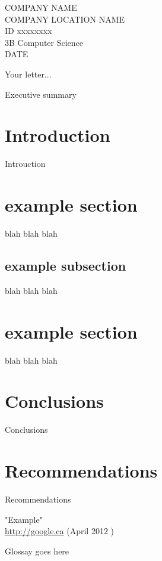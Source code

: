 \documentclass[12pt]{article}
\begin{document}
{
	COMPANY NAME\\
	COMPANY LOCATION
	}{
	NAME\\
	ID xxxxxxxx\\
	3B Computer Science \\
	DATE
}

\begin{UWletter}
Your letter...
\end{UWletter}



\UWtableofcontents



	Executive summary
\newpage




\ifoot[]{}
\cfoot[]{}
\ofoot[\pagemark]{\pagemark}
\pagestyle{scrplain}




\section{ Introduction }
	Introuction


\section{ example section }
	blah blah blah
	\subsection{ example subsection }
	blah blah blah
		

\section{ example section}
	blah blah blah

\section{ Conclusions }
	Conclusions

\section{ Recommendations }
Recommendations

\newpage
\begin{thebibliography}{9}
		"Example" \\ \url{http://google.ca} (April 2012 )
\end{thebibliography}
\newpage


Glossay goes here
\newpage


\end{document}

